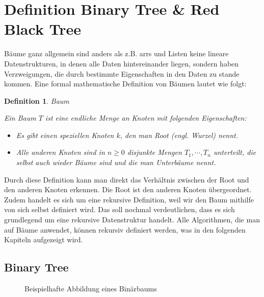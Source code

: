 \documentclass[11pt]{article}
\newtheorem{definition}{Definition}
\begin{document}
\section{Definition Binary Tree \& Red Black Tree} \label{def}

Bäume ganz allgemein sind anders als z.B. \glspl{arr} und Listen keine lineare Datenstrukturen, in denen alle Daten hintereinander liegen, sondern haben Verzweigungen, die durch bestimmte Eigenschaften in den Daten zu stande kommen.
Eine formal mathematische Definition von Bäumen lautet wie folgt:

\begin{definition}{Baum} \label{def_bin}
  
Ein Baum $T$ ist eine endliche Menge an Knoten mit folgenden Eigenschaften: 

\begin{itemize}
  \item Es gibt einen speziellen Knoten $k$, den man Root (engl. Wurzel) nennt.
  \item Alle anderen Knoten sind in $n \geq 0$ disjunkte Mengen $T_1, \cdots, T_n$ unterteilt, die selbst auch wieder Bäume sind und die man Unterbäume nennt. 
\end{itemize}
\end{definition}

Durch diese Definition kann man direkt das Verhältnis zwischen der Root und den anderen Knoten erkennen. Die Root ist den anderen Knoten übergeordnet. 
Zudem handelt es sich um eine rekursive Definition, weil wir den Baum mithilfe von sich selbst definiert wird.
Das soll nochmal verdeutlichen, dass es sich grundlegend um eine rekursive Datenstruktur handelt. Alle Algorithmen, die man auf Bäume anwendet, können rekursiv definiert werden, was in den folgenden 
Kapiteln aufgezeigt wird.
\cite[S. 308]{aop}

\pagebreak

\subsection{Binary Tree}

\begin{figure}    
    \caption{Beispielhafte Abbildung eines Binärbaums}
    \label{bin_ex}
\end{figure}
\end{document}

